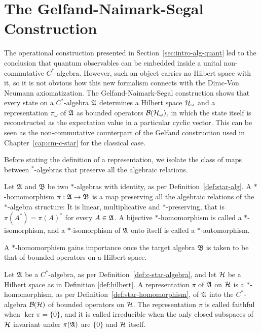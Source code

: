 \section{The Gelfand-Naimark-Segal Construction}
\label{sec:states-representations-gns}

The operational construction presented in Section~\ref{sec:intro-alg-quant} led to the conclusion that quantum observables can be embedded inside a unital non-commutative $C^*$-algebra. However, such an object carries no Hilbert space with it, so it is not obvious how this new formalism connects with the Dirac-Von Neumann axiomatization. The Gelfand-Naimark-Segal construction shows that every state on a $C^*$-algebra $\mathfrak{A}$ determines a Hilbert space $\H_\omega$ and a representation $\pi_\omega$ of $\mathfrak{A}$ as bounded operators $\mathcal{B}(\H_\omega)$, in which the state itself is reconstructed as the expectation value in a particular cyclic vector. This can be seen as the non-commutative counterpart of the Gelfand construction used in Chapter~\ref{cap:cm-c-star} for the classical case. 

Before stating the definition of a representation, we isolate the class of maps between $^*$-algebras that preserve all the algebraic relations. 

\begin{definition}
	\label{def:star-homomorphism}
	Let $\mathfrak{A}$ and $\mathfrak{B}$ be two $*$-algebras with identity, as per Definition~\ref{def:star-alg}. A $*$-homomorphism $\pi : \mathfrak{A} \to \mathfrak{B}$ is a map preserving all the algebraic relations of the $*$-algebra structure: It is linear, multiplicative and $*$-preserving, that is $\pi(A^*) = \pi(A)^*$ for every $A \in \mathfrak{A}$.
	A bijective $*$-homomorphism is called a $*$-isomorphism, and a $*$-isomorphism of $\mathfrak{A}$ onto itself is called a $*$-automorphism.
\end{definition}

\noindent A $*$-homomorphism gains importance once the target algebra $\mathfrak{B}$ is taken to be that of bounded operators on a Hilbert space. 

\begin{definition}
	\label{def:representation-c-star}
	Let $\mathfrak{A}$ be a $C^*$-algebra, as per Definition~\ref{def:c-star-algebra}, and let $\H$ be a Hilbert space as in Definition \ref{def:hilbert}. A representation $\pi$ of $\mathfrak{A}$ on $\H$ is a $*$-homomorphism, as per Definition~\ref{def:star-homomorphism}, of $\mathfrak{A}$ into the $C^*$-algebra $\mathcal{B}(\H)$ of bounded operators on $\H$. The representation $\pi$ is called faithful when $\ker \pi = \{0\}$, and it is called irreducible when the only closed subspaces of $\H$ invariant under $\pi(\mathfrak{A})$ are $\{0\}$ and $\H$ itself.
\end{definition}

